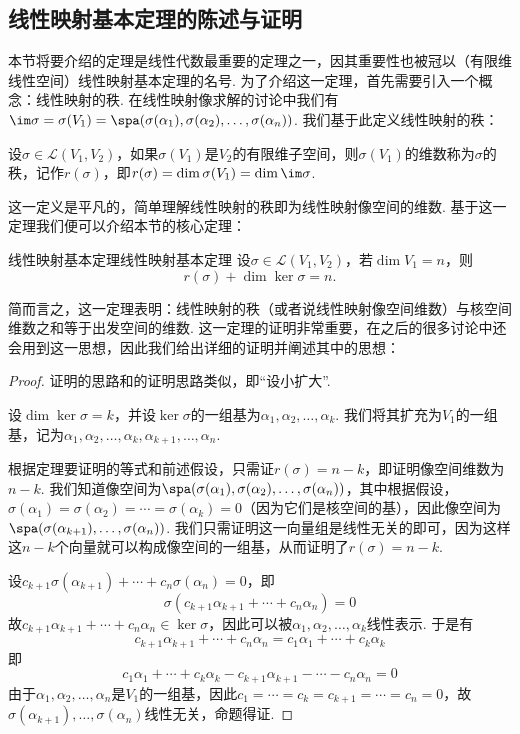 \subsection{线性映射基本定理的陈述与证明}

本节将要介绍的定理是线性代数最重要的定理之一，因其重要性也被冠以（有限维线性空间）线性映射基本定理的名号. 为了介绍这一定理，首先需要引入一个概念：线性映射的秩. 在线性映射像求解的讨论中我们有$\im \sigma=\sigma(V_1)=\spa(\sigma(\alpha_1),\sigma(\alpha_2),\ldots,\sigma(\alpha_n))$. 我们基于此定义线性映射的秩：
\begin{definition}{}{}
    设$\sigma\in \mathcal{L}(V_1,V_2)$，如果$\sigma(V_1)$是$V_2$的有限维子空间，则$\sigma(V_1)$的维数称为$\sigma$的秩，记作$r(\sigma)$，即$r(\sigma)=\dim \sigma(V_1)=\dim \im \sigma$.
\end{definition}

这一定义是平凡的，简单理解线性映射的秩即为线性映射像空间的维数. 基于这一定理我们便可以介绍本节的核心定理：

\begin{theorem}{线性映射基本定理}{线性映射基本定理}
    设$\sigma \in \mathcal{L}(V_1,V_2)$，若$\dim V_1=n$，则
    \[r(\sigma)+\dim\ker\sigma=n.\]
\end{theorem}
简而言之，这一定理表明：线性映射的秩（或者说线性映射像空间维数）与核空间维数之和等于出发空间的维数. 这一定理的证明非常重要，在之后的很多讨论中还会用到这一思想，因此我们给出详细的证明并阐述其中的思想：

\begin{proof}
    证明的思路和的证明思路类似，即``设小扩大''.

    设$\dim\ker\sigma=k$，并设$\ker\sigma$的一组基为$\alpha_1,\alpha_2,\ldots,\alpha_k$. 我们将其扩充为$V_1$的一组基，记为$\alpha_1,\alpha_2,\ldots,\alpha_k,\alpha_{k+1},\ldots,\alpha_n$.

    根据定理要证明的等式和前述假设，只需证$r(\sigma)=n-k$，即证明像空间维数为$n-k$. 我们知道像空间为$\spa(\sigma(\alpha_1),\sigma(\alpha_2),\ldots,\sigma(\alpha_n))$，其中根据假设，$\sigma(\alpha_1)=\sigma(\alpha_2)=\cdots=\sigma(\alpha_k)=0$（因为它们是核空间的基），因此像空间为$\spa(\sigma(\alpha_{k+1}),\ldots,\sigma(\alpha_n))$. 我们只需证明这一向量组是线性无关的即可，因为这样这$n-k$个向量就可以构成像空间的一组基，从而证明了$r(\sigma)=n-k$.

    设$c_{k+1}\sigma(\alpha_{k+1})+\cdots+c_n\sigma(\alpha_n)=0$，即
    \[\sigma(c_{k+1}\alpha_{k+1}+\cdots+c_n\alpha_n)=0\]
    故$c_{k+1}\alpha_{k+1}+\cdots+c_n\alpha_n \in \ker\sigma$，因此可以被$\alpha_1,\alpha_2,\ldots,\alpha_k$线性表示. 于是有
    \[c_{k+1}\alpha_{k+1}+\cdots+c_n\alpha_n=c_1\alpha_1+\cdots+c_k\alpha_k\]
    即
    \[c_1\alpha_1+\cdots+c_k\alpha_k-c_{k+1}\alpha_{k+1}-\cdots-c_n\alpha_n=0\]
    由于$\alpha_1,\alpha_2,\ldots,\alpha_n$是$V_1$的一组基，因此$c_1=\cdots=c_k=c_{k+1}=\cdots=c_n=0$，故$\sigma(\alpha_{k+1}),\ldots,\sigma(\alpha_n)$线性无关，命题得证.
\end{proof}

